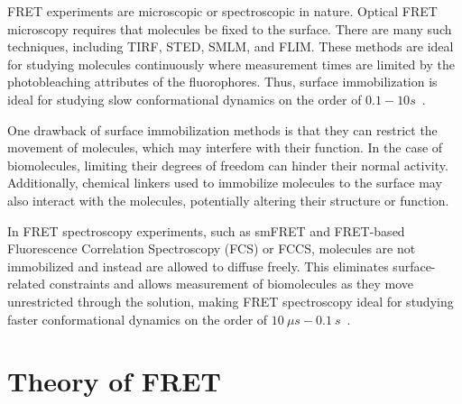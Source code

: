 FRET experiments are microscopic or spectroscopic in nature.
Optical FRET microscopy requires that molecules be fixed to the surface.
There are many such techniques, including \ac{TIRF}, \ac{STED}, \ac{SMLM}, and \ac{FLIM}. 
These methods are ideal for studying molecules continuously where measurement times are limited by the photobleaching attributes of the fluorophores.  
Thus, surface immobilization is ideal for studying slow conformational dynamics on the order of $0.1 - 10 s$~\cite{lerner_Science_2018}.

One drawback of surface immobilization methods is that they can restrict the movement of molecules, which may interfere with their function. 
In the case of biomolecules, limiting their degrees of freedom can hinder their normal activity. 
Additionally, chemical linkers used to immobilize molecules to the surface may also interact with the molecules, potentially altering their structure or function. 

In FRET spectroscopy experiments, such as \ac{smFRET} and FRET-based Fluorescence Correlation Spectroscopy (\ac{FCS}) or \ac{FCCS}, molecules are not immobilized and instead are allowed to diffuse freely.
This eliminates surface-related constraints and allows measurement of biomolecules as they move unrestricted through the solution, making FRET spectroscopy ideal for studying faster conformational dynamics on the order of $10~\mu s - 0.1~s$~\cite{lerner_Science_2018}. 


\section{Theory of FRET
\label{sec:FRET_theory}}

